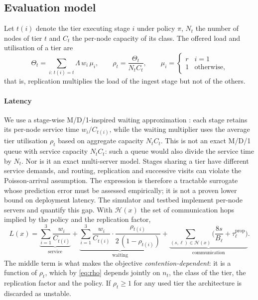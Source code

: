 \documentclass[preprint,11pt,3p]{elsarticle}
\theoremstyle{plain}
\theoremstyle{definition}
\begin{document}
\subsection{Evaluation model}
Let $t(i)$ denote the tier executing stage $i$ under policy $\pi$, $N_t$ the number of
nodes of tier $t$ and $C_t$ the per-node capacity of its class. The offered load and
utilisation of a tier are
\begin{equation}
\Theta_t=\sum_{i:\,t(i)=t}\Lambda\,w_i\,\mu_i,\qquad
\rho_t=\frac{\Theta_t}{N_t C_t},\qquad
\mu_i=\begin{cases} r & i=1\\ 1 & \text{otherwise,}\end{cases}
\label{eq:rho}
\end{equation}
that is, replication multiplies the load of the ingest stage but not of the others.

\paragraph{Latency}
We use a stage-wise M/D/1-inspired waiting approximation
\cite{kleinrock1975queueing,harchol2013performance}: each stage retains its
per-node service time $w_i/C_{t(i)}$, while the waiting multiplier uses the
average tier utilisation $\rho_t$ based on aggregate capacity $N_tC_t$.
This is not an exact M/D/1 queue with service capacity $N_tC_t$: such a queue
would also divide the service time by $N_t$. Nor is it an exact multi-server
model. Stages sharing a tier have different service demands, and routing,
replication and successive visits can violate the Poisson-arrival assumption.
The expression is therefore a tractable surrogate whose prediction error must
be assessed empirically; it is not a proven lower bound on deployment latency.
The simulator and testbed implement per-node servers and quantify this gap.
With
$\mathcal{H}(x)$ the set of communication hops implied by the policy and the replication
factor,
\begin{equation}
L(x)=\underbrace{\sum_{i=1}^{3}\frac{w_i}{C_{t(i)}}}_{\text{service}}
+\underbrace{\sum_{i=1}^{3}\frac{w_i}{C_{t(i)}}\cdot\frac{\rho_{t(i)}}{2\,(1-\rho_{t(i)})}}_{\text{waiting}}
+\underbrace{\sum_{(s,\ell)\in\mathcal{H}(x)}\Big(\frac{8s}{B_\ell}+\tau^{\mathrm{prop}}_\ell\Big)}_{\text{communication}} .
\label{eq:latency}
\end{equation}
The middle term is what makes the objective \emph{contention-dependent}: it is a
function of $\rho_t$, which by \eqref{eq:rho} depends jointly on $n_t$, the class of the
tier, the replication factor and the policy. If $\rho_t\ge1$ for any used tier the
architecture is discarded as unstable.
\end{document}
